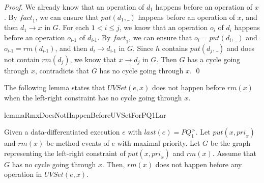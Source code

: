 \begin {proof}
We already know that an operation of $d_1$ happens before an operation of $x$. By $\textit{fact}_1$, we can ensure that $\textit{put}(d_1,\_)$ happens before an operation of $x$, and then $d_1 \rightarrow x$ in $G$. For each $1 < i \leq j$, we know that an operation $o_i$ of $d_i$ happens before an operation $o_{\textit{i-1}}$ of $d_{\textit{i-1}}$. By $\textit{fact}_1$, we can ensure that $o_i=\textit{put}(d_i,\_)$ and $o_{\textit{i-1}}=\textit{rm}(d_{\textit{i-1}})$, and then $d_i \rightarrow d_{\textit{i-1}}$ in $G$. Since $h$ contains $\textit{put}(d_j,\_)$ and does not contain $\textit{rm}(d_j)$, we know that $x \rightarrow d_j$ in $G$. Then $G$ has a cycle going through $x$, contradicts that $G$ has no cycle going through $x$. \qed
\end {proof}


The following lemma states that $\textit{UVSet}(e,x)$ does not happen before $\textit{rm}(x)$ when the left-right constraint has no cycle going through $x$.

\begin{restatable}{lemma}{RmxDoesNotHappenBeforeUVSetForPQ1Lar}
\label{lemma:Rmx does not happen before UVSet for PQ1Lar}

Given a data-differentiated execution $e$ with $\textit{last}(e) = \textit{PQ}_1^{>}$. Let $\textit{put}(x,\textit{pri}_x)$ and $\textit{rm}(x)$ be method events of $e$ with maximal priority. Let $G$ be the graph representing the left-right constraint of $\textit{put}(x,\textit{pri}_x)$ and $\textit{rm}(x)$. Assume that $G$ has no cycle going through $x$. Then, $\textit{rm}(x)$ does not happen before any operation in $\textit{UVSet}(e,x)$.
\end{restatable}

